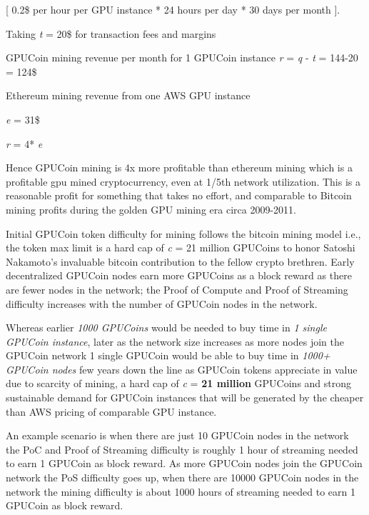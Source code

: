 [ 0.2\$ per hour per GPU instance * 24 hours per day * 30 days per month ].


Taking \emph{t} = 20\$ for transaction fees and margins

GPUCoin mining revenue per month for 1 GPUCoin instance
\emph{r} = \emph{q} - \emph{t} = 144-20 = 124\$

Ethereum mining revenue from one AWS GPU instance

\emph{e} = 31\$

\emph{r} = 4* \emph{e}  

Hence GPUCoin mining is 4x more profitable than ethereum mining which is a profitable gpu mined cryptocurrency, even at 1/5th network utilization. This is a reasonable profit for something that takes no effort, and comparable to Bitcoin mining profits during the golden GPU mining era circa 2009-2011.

Initial GPUCoin token difficulty for mining follows the bitcoin mining model i.e., the token max limit is a hard cap of \emph{c} = 21 million GPUCoins to honor Satoshi Nakamoto’s invaluable bitcoin contribution to the fellow crypto brethren. Early decentralized GPUCoin nodes earn more GPUCoins as a block reward as there are fewer nodes in the network; the Proof of Compute and Proof of Streaming difficulty increases with the number of GPUCoin nodes in the network.

Whereas earlier \emph{1000 GPUCoins} would be needed to buy time in \emph{1 single GPUCoin instance}, later as the network size increases as more nodes join the GPUCoin network 1 single GPUCoin would be able to buy time in \emph{1000+ GPUCoin nodes} few years down the line as GPUCoin tokens appreciate in value due to scarcity of mining, a hard cap of \emph{c} = \textbf{21 million} GPUCoins and strong sustainable demand for GPUCoin instances that will be generated by the cheaper than AWS pricing of comparable GPU instance.

An example scenario is when there are just 10 GPUCoin nodes in the network the PoC and Proof of Streaming difficulty is roughly 1 hour of streaming needed to earn 1 GPUCoin as block reward. As more GPUCoin nodes join the GPUCoin network the PoS difficulty goes up, when there are 10000 GPUCoin nodes in the network the mining difficulty is about 1000 hours of streaming needed to earn 1 GPUCoin as block reward.

